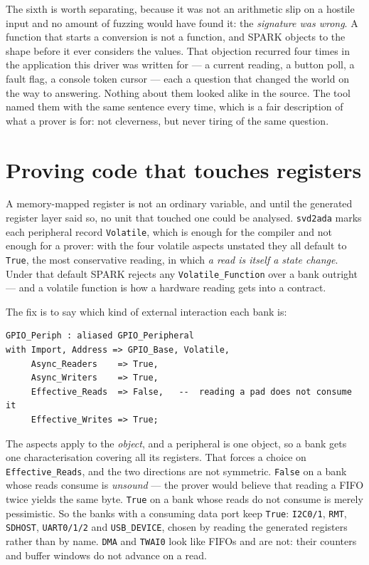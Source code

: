 The sixth is worth separating, because it was not an arithmetic slip on a hostile input
and no amount of fuzzing would have found it: the \emph{signature was wrong}. A
function that starts a conversion is not a function, and SPARK objects to the shape
before it ever considers the values. That objection recurred four times in the
application this driver was written for --- a current reading, a button poll, a fault
flag, a console token cursor --- each a question that changed the world on the way to
answering. Nothing about them looked alike in the source. The tool named them with the
same sentence every time, which is a fair description of what a prover is for: not
cleverness, but never tiring of the same question.

\section{Proving code that touches registers}\label{spark:registers}

A memory-mapped register is not an ordinary variable, and until the generated register
layer said so, no unit that touched one could be analysed. \texttt{svd2ada} marks each
peripheral record \lstinline{Volatile}, which is enough for the compiler and not enough
for a prover: with the four volatile aspects unstated they all default to
\lstinline{True}, the most conservative reading, in which \emph{a read is itself a state
change}. Under that default SPARK rejects any \lstinline{Volatile_Function} over a bank
outright --- and a volatile function is how a hardware reading gets into a contract.

The fix is to say which kind of external interaction each bank is:

\begin{lstlisting}
GPIO_Periph : aliased GPIO_Peripheral
with Import, Address => GPIO_Base, Volatile,
     Async_Readers    => True,
     Async_Writers    => True,
     Effective_Reads  => False,   --  reading a pad does not consume it
     Effective_Writes => True;
\end{lstlisting}

The aspects apply to the \emph{object}, and a peripheral is one object, so a bank gets
one characterisation covering all its registers. That forces a choice on
\lstinline{Effective_Reads}, and the two directions are not symmetric.
\lstinline{False} on a bank whose reads consume is \emph{unsound} --- the prover would
believe that reading a FIFO twice yields the same byte. \lstinline{True} on a bank whose
reads do not consume is merely pessimistic. So the banks with a consuming data port keep
\lstinline{True}: \texttt{I2C0/1}, \texttt{RMT}, \texttt{SDHOST}, \texttt{UART0/1/2} and
\texttt{USB\_DEVICE}, chosen by reading the generated registers rather than by name.
\texttt{DMA} and \texttt{TWAI0} look like FIFOs and are not: their counters and buffer
windows do not advance on a read.

